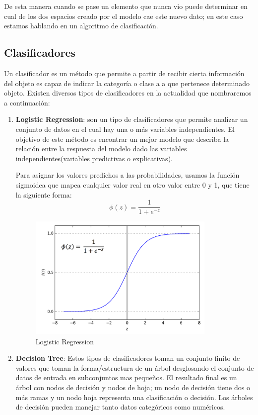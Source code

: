 De esta manera cuando se pase un elemento que nunca vio puede determinar en cual de los dos espacios creado por el modelo cae este nuevo dato; en este caso estamos hablando en un algoritmo de clasificación.


\subsection{Clasificadores}\label{sub:clasificadores}

Un clasificador es un método que permite a partir de recibir cierta información del objeto es capaz de indicar la categoría o clase a a que pertenece determinado objeto. Existen diversos tipos de clasificadores en la actualidad que nombraremos a continuación:

\begin{enumerate}
\item \textbf{Logistic Regression}: son un tipo de clasificadores que permite analizar un conjunto de datos en el cual hay una o más variables independientes. El objetivo de este método es encontrar un mejor modelo que describa la relación entre la respuesta del modelo dado las variables independientes(variables predictivas o explicativas). 

Para asignar los valores predichos a las probabilidades, usamos la función sigmoidea que mapea cualquier valor real en otro valor entre 0 y 1, que tiene la siguiente forma:
\begin{equation}
\phi(z) = \frac{1}{1+e^{-z}}
\end{equation}

\begin{figure}[H]
 \centering
  \includegraphics[height=6cm,keepaspectratio=true,clip=true]{imagenes/MarcoTeorico/sigmoide.png}
  \caption{Logistic Regression}
  \label{Fig: log_reg}
\end{figure}


\item \textbf{Decision Tree}: Estos tipos de clasificadores toman un conjunto finito de valores  que toman la forma/estructura de un árbol desglosando el conjunto de datos de entrada en subconjuntos mas pequeños. El resultado final es un árbol con nodos de decisión y nodos de hoja; un nodo de decisión tiene dos o más ramas y un nodo hoja representa una clasificación o decisión. Los árboles de decisión pueden manejar tanto datos categóricos como numéricos.
  

\end{enumerate}
